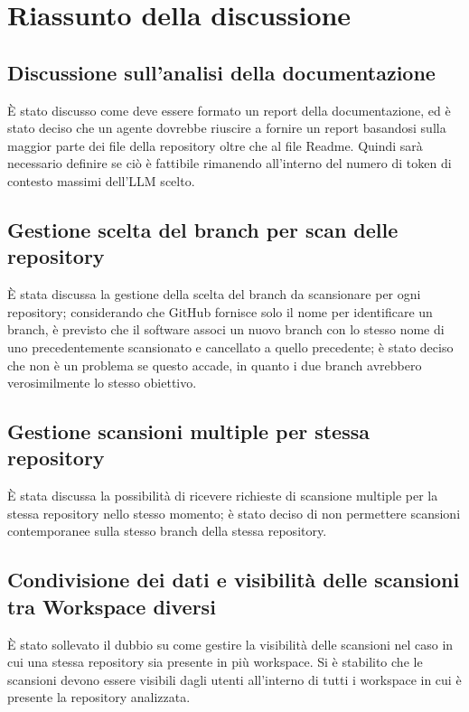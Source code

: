 \documentclass[a4paper, 11pt]{article}
\begin{document}
\newpage

\section{Riassunto della discussione}

\subsection{Discussione sull'analisi della documentazione}
È stato discusso come deve essere formato un report della documentazione, ed è stato deciso che un agente dovrebbe riuscire a fornire un report basandosi sulla maggior parte dei file della repository oltre che al file Readme. Quindi sarà necessario definire se ciò è fattibile rimanendo all'interno del numero di token di contesto massimi dell'LLM scelto.

\subsection{Gestione scelta del branch per scan delle repository}
È stata discussa la gestione della scelta del branch da scansionare per ogni repository; considerando che GitHub fornisce solo il nome per identificare un branch, è previsto che il software associ un nuovo branch con lo stesso nome di uno precedentemente scansionato e cancellato a quello precedente; è stato deciso che non è un problema se questo accade, in quanto i due branch avrebbero verosimilmente lo stesso obiettivo. 

\subsection{Gestione scansioni multiple per stessa repository}
È stata discussa la possibilità di ricevere richieste di scansione multiple per la stessa repository nello stesso momento; è stato deciso di non permettere scansioni contemporanee sulla stesso branch della stessa repository.

\subsection{Condivisione dei dati e visibilità delle scansioni tra Workspace diversi}
È stato sollevato il dubbio su come gestire la visibilità delle scansioni nel caso in cui una stessa repository sia presente in più workspace. Si è stabilito che le scansioni devono essere visibili dagli utenti all'interno di tutti i workspace in cui è presente la repository analizzata.
\end{document}
